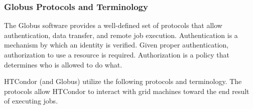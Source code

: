 \subsubsection{\label{sec:Globus-Protocols}Globus Protocols and Terminology}
The Globus software provides a well-defined set of protocols
that allow authentication, data transfer, and remote job execution.
Authentication is a mechanism by which an identity is verified.
Given proper authentication, authorization to use a resource
is required.
Authorization is a policy that determines who is allowed to do what. 

HTCondor (and Globus) utilize the following protocols and terminology.
The protocols allow HTCondor to interact with grid machines toward
the end result of executing jobs.
